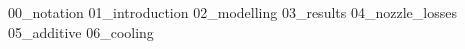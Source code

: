 {00_notation}
\pagebreak
{}
{01_introduction}
{02_modelling}
{03_results}
{04_nozzle_losses}
{05_additive}
{06_cooling}